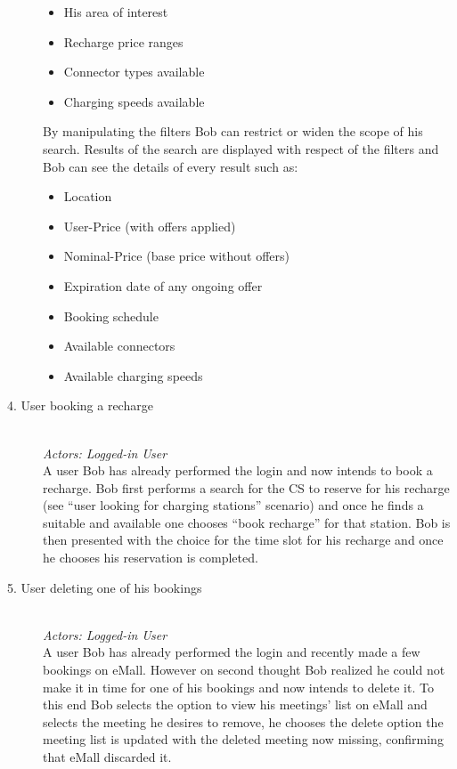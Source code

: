 \documentclass[11pt]{article}
\begin{document}
\begin{description}
\begin{itemize}
            \item His area of interest
            \item Recharge price ranges
            \item Connector types available
            \item Charging speeds available
        \end{itemize}
        By manipulating the filters Bob can restrict or widen the scope of his search. Results of the search are displayed with respect of the filters and Bob can see the details of every result such as:
        \begin{itemize}
            \item Location
            \item User-Price (with offers applied)
            \item Nominal-Price (base price without offers)
            \item Expiration date of any ongoing offer
            \item Booking schedule
            \item Available connectors
            \item Available charging speeds
        \end{itemize}
    \item [4. User booking a recharge] \hfill \\
        \textit{Actors: Logged-in User} \\
        A user Bob has already performed the login and now intends to book a recharge. Bob first performs a search for the CS to reserve for his recharge (see “user looking for charging stations” scenario) and once he finds a suitable and available one chooses “book recharge” for that station. Bob is then presented with the choice for the time slot for his recharge and once he chooses his reservation is completed. \\
    \item [5. User deleting one of his bookings] \hfill \\
        \textit{Actors: Logged-in User} \\
        A user Bob has already performed the login and recently made a few bookings on eMall. However on second thought Bob realized he could not make it in time for one of his bookings and now intends to delete it. To this end Bob selects the option to view his meetings' list on eMall and selects the meeting he desires to remove, he chooses the delete option the meeting list is updated with the deleted meeting now missing, confirming that eMall discarded it.

\end{description}
\end{document}
